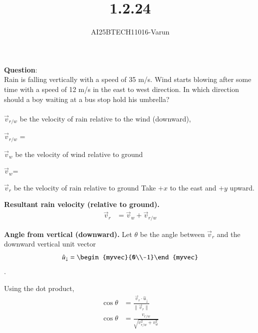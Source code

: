 \documentclass[journal]{IEEEtran}
\begin{document}

\vspace{3cm}

\title{1.2.24}
\author{AI25BTECH11016-Varun}
 \maketitle
{\let\newpage\relax\maketitle}
\renewcommand{\thefigure}{\theenumi}
\renewcommand{\thetable}{\theenumi}
\setlength{\intextsep}{10pt} %
\renewcommand{\thetable}{\theenumi}
\textbf{Question}:\\

Rain is falling vertically with a speed of 35 m/s. Wind starts blowing after some time with a speed of 12 m/s in the east to west direction. In which direction should a boy waiting at a bus stop hold his umbrella?\\

\solution \\

$\vec{v}_{r/w}$ be the velocity of rain relative to the wind (downward), 


$\vec{v}_{r/w}$ = 

$\vec{v}_{w}$ be the velocity of wind relative to ground

$\vec{v}_w $= 

$\vec{v}_{r}$ be the velocity of rain relative to ground 
Take $+x$ to the east and $+y$ upward.


\textbf{Resultant rain velocity (relative to ground).}
\begin{align}
    \vec{v}_{r} &= \vec{v}_{w} + \vec{v}_{r/w}
\end{align}


\textbf{Angle from vertical (downward).} Let $\theta$ be the angle between $\vec{v}_{r}$ and the downward vertical unit vector $$\hat{u}_{\downarrow}=\begin{myvec}{0\\-1}\end{myvec}$$.




Using the dot product,
\begin{align}
    \cos\theta &= \frac{\vec{v}_{r}\cdot \hat{u}_{\downarrow}}{\|\vec{v}_{r}\|} \\
    \cos\theta &= \frac{v_{r/w}}{\sqrt{v_{r/w}^2 + v_w^2}}
\end{align}
\end{document}
